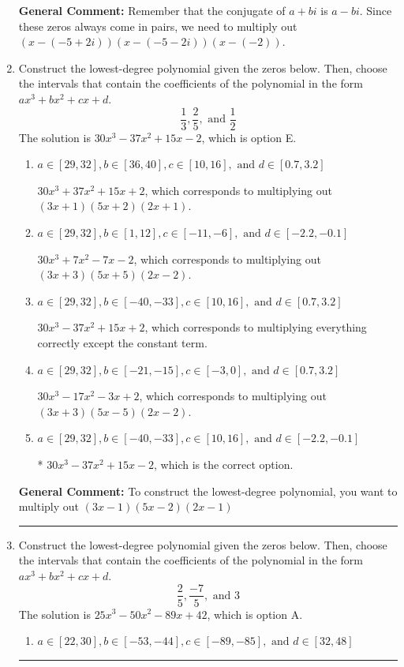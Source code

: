 \documentclass{extbook}[14pt]
\newcommand{\litem}[1]{\item #1

\rule{\textwidth}{0.4pt}}
\begin{document}
\begin{enumerate}
{\textbf{General Comment:} Remember that the conjugate of $a+bi$ is $a-bi$. Since these zeros always come in pairs, we need to multiply out $(x-(-5 + 2 i))(x-(-5 - 2 i))(x-(-2))$.
}
\litem{
Construct the lowest-degree polynomial given the zeros below. Then, choose the intervals that contain the coefficients of the polynomial in the form $ax^3+bx^2+cx+d$.
\[ \frac{1}{3}, \frac{2}{5}, \text{ and } \frac{1}{2} \]
The solution is \( 30x^{3} -37 x^{2} +15 x -2 \), which is option E.\begin{enumerate}[label=\Alph*.]
\item \( a \in [29, 32], b \in [36, 40], c \in [10, 16], \text{ and } d \in [0.7, 3.2] \)

$30x^{3} +37 x^{2} +15 x + 2$, which corresponds to multiplying out $(3x + 1)(5x + 2)(2x + 1)$.
\item \( a \in [29, 32], b \in [1, 12], c \in [-11, -6], \text{ and } d \in [-2.2, -0.1] \)

$30x^{3} +7 x^{2} -7 x -2$, which corresponds to multiplying out $(3x + 3)(5x + 5)(2x -2)$.
\item \( a \in [29, 32], b \in [-40, -33], c \in [10, 16], \text{ and } d \in [0.7, 3.2] \)

$30x^{3} -37 x^{2} +15 x + 2$, which corresponds to multiplying everything correctly except the constant term.
\item \( a \in [29, 32], b \in [-21, -15], c \in [-3, 0], \text{ and } d \in [0.7, 3.2] \)

$30x^{3} -17 x^{2} -3 x + 2$, which corresponds to multiplying out $(3x + 3)(5x -5)(2x -2)$.
\item \( a \in [29, 32], b \in [-40, -33], c \in [10, 16], \text{ and } d \in [-2.2, -0.1] \)

* $30x^{3} -37 x^{2} +15 x -2$, which is the correct option.
\end{enumerate}

\textbf{General Comment:} To construct the lowest-degree polynomial, you want to multiply out $(3x -1)(5x -2)(2x -1)$
}
\litem{
Construct the lowest-degree polynomial given the zeros below. Then, choose the intervals that contain the coefficients of the polynomial in the form $ax^3+bx^2+cx+d$.
\[ \frac{2}{5}, \frac{-7}{5}, \text{ and } 3 \]
The solution is \( 25x^{3} -50 x^{2} -89 x + 42 \), which is option A.\begin{enumerate}[label=\Alph*.]
\item \( a \in [22, 30], b \in [-53, -44], c \in [-89, -85], \text{ and } d \in [32, 48] \)


\end{enumerate}}
\end{enumerate}
\end{document}
